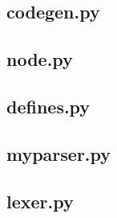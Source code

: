 \documentclass[letterpaper,10pt]{article}
\begin{document}
\subsection{codegen.py}

\subsection{node.py}

\subsection{defines.py}

\subsection{myparser.py}

\subsection{lexer.py}

\end{document}
